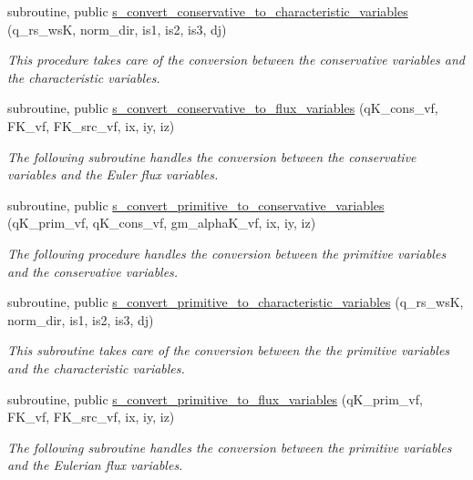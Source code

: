 \begin{DoxyCompactItemize}
subroutine, public \hyperlink{namespacem__variables__conversion_af05a8e081300b76aa2a685d598cb5b92}{s\+\_\+convert\+\_\+conservative\+\_\+to\+\_\+characteristic\+\_\+variables} (q\+\_\+rs\+\_\+wsK, norm\+\_\+dir, is1, is2, is3, dj)
\begin{DoxyCompactList}\small\item\em This procedure takes care of the conversion between the conservative variables and the characteristic variables. \end{DoxyCompactList}\item 
subroutine, public \hyperlink{namespacem__variables__conversion_abede800c9696158470575d8758460360}{s\+\_\+convert\+\_\+conservative\+\_\+to\+\_\+flux\+\_\+variables} (q\+K\+\_\+cons\+\_\+vf, F\+K\+\_\+vf, F\+K\+\_\+src\+\_\+vf, ix, iy, iz)
\begin{DoxyCompactList}\small\item\em The following subroutine handles the conversion between the conservative variables and the Euler flux variables. \end{DoxyCompactList}\item 
subroutine, public \hyperlink{namespacem__variables__conversion_a1dbfde20c4af4e0ad0989f4629889809}{s\+\_\+convert\+\_\+primitive\+\_\+to\+\_\+conservative\+\_\+variables} (q\+K\+\_\+prim\+\_\+vf, q\+K\+\_\+cons\+\_\+vf, gm\+\_\+alpha\+K\+\_\+vf, ix, iy, iz)
\begin{DoxyCompactList}\small\item\em The following procedure handles the conversion between the primitive variables and the conservative variables. \end{DoxyCompactList}\item 
subroutine, public \hyperlink{namespacem__variables__conversion_a7f62727a697f6be7f205bbc65156d508}{s\+\_\+convert\+\_\+primitive\+\_\+to\+\_\+characteristic\+\_\+variables} (q\+\_\+rs\+\_\+wsK, norm\+\_\+dir, is1, is2, is3, dj)
\begin{DoxyCompactList}\small\item\em This subroutine takes care of the conversion between the the primitive variables and the characteristic variables. \end{DoxyCompactList}\item 
subroutine, public \hyperlink{namespacem__variables__conversion_a93f1bb8b4aee426f508a6ceef721a35c}{s\+\_\+convert\+\_\+primitive\+\_\+to\+\_\+flux\+\_\+variables} (q\+K\+\_\+prim\+\_\+vf, F\+K\+\_\+vf, F\+K\+\_\+src\+\_\+vf, ix, iy, iz)
\begin{DoxyCompactList}\small\item\em The following subroutine handles the conversion between the primitive variables and the Eulerian flux variables. \end{DoxyCompactList}\item 

\end{DoxyCompactItemize}
